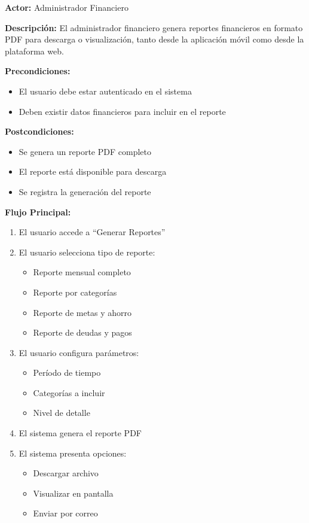 \noindent\textbf{Actor:} Administrador Financiero

\noindent\textbf{Descripción:} El administrador financiero genera reportes financieros en formato PDF para descarga o visualización, tanto desde la aplicación móvil como desde la plataforma web.

\noindent\textbf{Precondiciones:}
\begin{itemize}
    \item El usuario debe estar autenticado en el sistema
    \item Deben existir datos financieros para incluir en el reporte
\end{itemize}

\noindent\textbf{Postcondiciones:}
\begin{itemize}
    \item Se genera un reporte PDF completo
    \item El reporte está disponible para descarga
    \item Se registra la generación del reporte
\end{itemize}

\noindent\textbf{Flujo Principal:}
\begin{enumerate}
    \item El usuario accede a ``Generar Reportes''
    \item El usuario selecciona tipo de reporte:
    \begin{itemize}
        \item Reporte mensual completo
        \item Reporte por categorías
        \item Reporte de metas y ahorro
        \item Reporte de deudas y pagos
    \end{itemize}
    \item El usuario configura parámetros:
    \begin{itemize}
        \item Período de tiempo
        \item Categorías a incluir
        \item Nivel de detalle
    \end{itemize}
    \item El sistema genera el reporte PDF
    \item El sistema presenta opciones:
    \begin{itemize}
        \item Descargar archivo
        \item Visualizar en pantalla
        \item Enviar por correo
    \end{itemize}
\end{enumerate}


